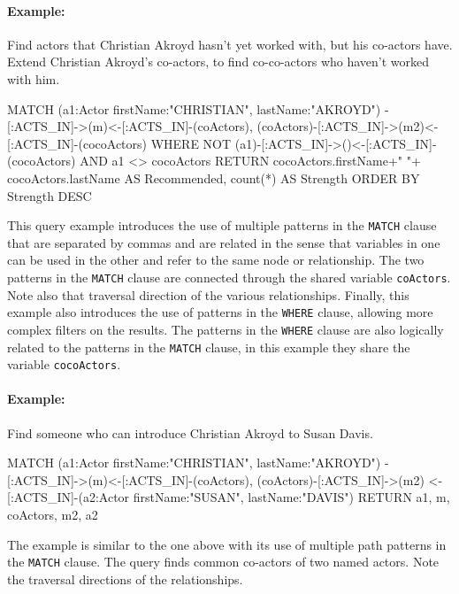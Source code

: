 \begin{withcode}
\paragraph*{Example:} Find actors that Christian Akroyd hasn't yet worked with, but his co-actors have. Extend Christian Akroyd's co-actors, to find co-co-actors who haven't worked with him.

\begin{cyphercode}
MATCH (a1:Actor {firstName:"CHRISTIAN", lastName:"AKROYD"})
         -[:ACTS_IN]->(m)<-[:ACTS_IN]-(coActors),
      (coActors)-[:ACTS_IN]->(m2)<-[:ACTS_IN]-(cocoActors)
WHERE NOT (a1)-[:ACTS_IN]->()<-[:ACTS_IN]-(cocoActors) 
      AND a1 <> cocoActors
RETURN cocoActors.firstName+" "+
       cocoActors.lastName AS Recommended, 
       count(*) AS Strength 
ORDER BY Strength DESC
\end{cyphercode}

This query example introduces the use of multiple patterns in the \texttt{MATCH} clause that are separated by commas and are related in the sense that variables in one can be used in the other and refer to the same node or relationship. The two patterns in the \texttt{MATCH} clause are connected through the shared variable \texttt{coActors}. Note also that traversal direction of the various relationships. Finally, this example also introduces the use of patterns in the \texttt{WHERE} clause, allowing more complex filters on the results. The patterns in the \texttt{WHERE} clause are also logically related to the patterns in the \texttt{MATCH} clause, in this example they share the variable \texttt{cocoActors}.

\paragraph*{Example:} Find someone who can introduce Christian Akroyd to Susan Davis.

\begin{cyphercode}
MATCH (a1:Actor {firstName:"CHRISTIAN", lastName:"AKROYD"})
        -[:ACTS_IN]->(m)<-[:ACTS_IN]-(coActors),
      (coActors)-[:ACTS_IN]->(m2)
        <-[:ACTS_IN]-(a2:Actor {firstName:"SUSAN", lastName:"DAVIS"})
RETURN a1, m, coActors, m2, a2
\end{cyphercode}

The example is similar to the one above with its use of multiple path patterns in the \texttt{MATCH} clause. The query finds common co-actors of two named actors. Note the traversal directions of the relationships.


\end{withcode}
